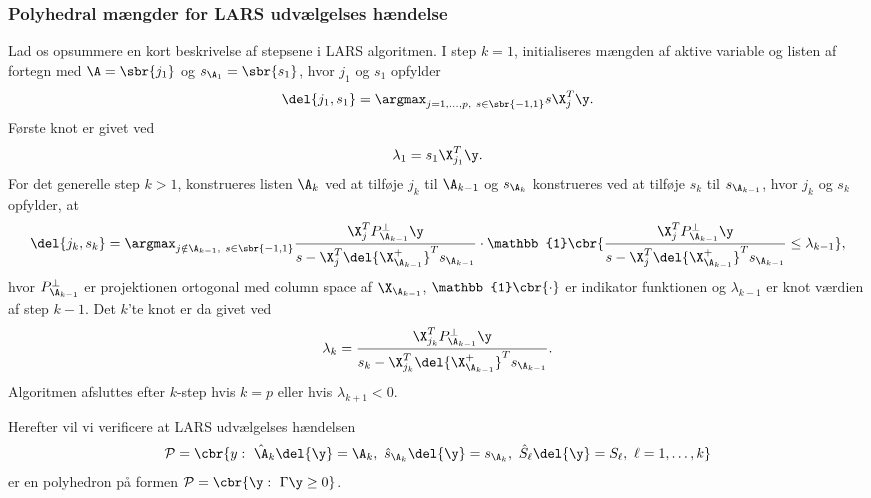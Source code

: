 \subsubsection{Polyhedral mængder for LARS udvælgelses hændelse}
Lad os opsummere en kort beskrivelse af stepsene i LARS algoritmen.
I step \(k=1\), initialiseres mængden af aktive variable og listen af fortegn med \(\A=\sbr{j_1}\) og \(s_{\A_1} = \sbr{s_1}\), hvor \(j_1\) og \(s_1\) opfylder
\begin{align}
\del{j_1, s_1} = \argmax_{j=1,\ldots, p, \ s \in \sbr{-1,1}} s \X_j^T \y. \label{eq:polyhedron_rep_LARS1}
\end{align}
Første knot er givet ved
\begin{align*}
\lambda_1 = s_1 \X_{j_1}^T \y.
\end{align*}
For det generelle step \(k > 1\), konstrueres listen \(\A_k\) ved at tilføje \(j_k\) til \(\A_{k-1}\) og \(s_{\A_k}\) konstrueres ved at tilføje \(s_k\) til \(s_{\A_{k-1}}\), hvor \(j_k\) og \(s_k\) opfylder, at
\begin{align}
\del{j_k, s_k} = \argmax_{j \notin \A_{k-1} , \ s \in \sbr{-1,1}} \frac{\X_j^T P_{\A_{k-1}}^\perp \y}{s - \X_j^T \del{\X_{\A_{k-1}}^+}^T s_{\A_{k-1}}} \cdot \mathbb{1} \cbr{\frac{\X_j^T P_{\A_{k-1}}^\perp \y}{s - \X_j^T \del{\X_{\A_{k-1}}^+}^T s_{\A_{k-1}}} \leq \lambda_{k-1}}, \label{eq:polyhedron_rep_LARS2}
\end{align}
hvor \(P_{\A_{k-1}}^\perp \) er projektionen ortogonal med column space af \(\X_{\A_{k-1}}\), \(\mathbb{1} \cbr{\cdot}\) er indikator funktionen og \(\lambda_{k-1}\) er knot værdien af step \(k-1\).
Det \(k\)'te knot er da givet ved
\begin{align}
\lambda_k = \frac{\X_{j_k}^T P_{\A_{k-1}}^\perp \y}{s_k - \X_{j_k}^T \del{\X_{\A_{k-1}}^+}^T s_{\A_{k-1}}}. \label{eq:polyhedron_rap_LARS3}
\end{align}
Algoritmen afsluttes efter \(k\)-step hvis \(k=p\) eller hvis \(\lambda_{k+1} < 0\).

Herefter vil vi verificere at LARS udvælgelses hændelsen
\begin{align}
\mathcal{P} = \cbr{y: \ \hat{\A}_k \del{\y} = \A_k, \ \hat{s}_{\A_k} \del{\y} = s_{\A_k}, \ \hat{S}_\ell \del{\y} = S_\ell, \ \ell = 1, \ldots, k} \label{eq:post_28}
\end{align}
er en polyhedron på formen \(\mathcal{P} = \cbr{\y : \ \Gamma \y \geq 0}\).

